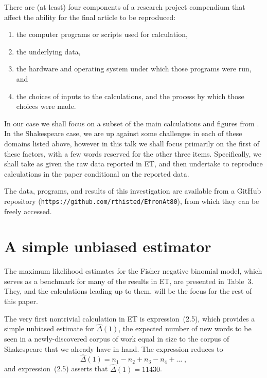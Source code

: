 \documentclass[
  letterpaper, %
  11pt, %
  oneside,  %
  onecolumn,  %
  openany,  %
  article
]{memoir}
\begin{document}
There are (at least) four components of a research project compendium that affect the ability for the final article to be reproduced:
	\begin{enumerate}
		\item the computer programs or scripts used for calculation,
		\item the underlying data,
		\item the hardware and operating system under which those programs were run, and
		\item the choices of inputs to the calculations, and the process by which those choices were made.
	\end{enumerate}
	
	  In our case we shall focus on a subset of the main calculations and figures from \citet{Efron:1976zs}. In the Shakespeare case, we are up against some challenges in each of these domains listed above, however in this talk we shall focus primarily on the first of these factors, with a few words reserved for the other three items.  Specifically, we shall take as given the raw data reported in ET, and then undertake to reproduce calculations in the paper conditional on the reported data.
	  
	  The data, programs, and results of this investigation are available from a GitHub repository (\texttt{https://github.com/rthisted/EfronAt80}), from which they can be freely accessed.
	





\chapter[]{A simple unbiased estimator}

The maximum likelihood estimates for the Fisher negative binomial model, which serves as a benchmark for many of the results in ET, are presented in Table~3.  They, and the calculations leading up to them, will be the focus for the rest of this paper.

The very first nontrivial calculation in ET is expression~(2.5), which provides a simple unbiased estimate for $\hat\Delta(1)$, the expected number of new words to be seen in a newly-discovered corpus of work equal in size to the corpus of Shakespeare that we already have in hand.  The expression reduces to
\begin{equation}
	\hat\Delta(1) = n_1-n_2+n_3-n_4+\ldots\;,
	\label{eq:unbiased}
\end{equation}
and expression~(2.5) asserts that $\hat\Delta(1)=11430$.
\end{document}
